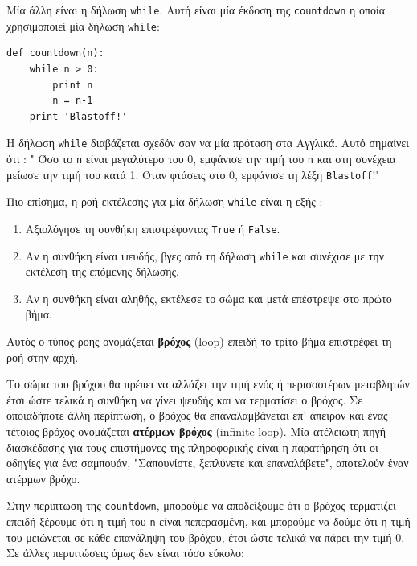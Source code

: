\documentclass[10pt]{book}
\begin{document}
Μία άλλη είναι η δήλωση {\tt while}. Αυτή είναι μία έκδοση
της {\tt countdown} η οποία χρησιμοποιεί μία δήλωση {\tt while}:

\begin{verbatim}
def countdown(n):
    while n > 0:
        print n
        n = n-1
    print 'Blastoff!'
\end{verbatim}
%

Η δήλωση {\tt while} διαβάζεται σχεδόν σαν να μία πρόταση στα Αγγλικά.
Αυτό σημαίνει ότι : " Όσο το {\tt n} είναι μεγαλύτερο του 0,
εμφάνισε την τιμή του {\tt n} και στη συνέχεια μείωσε την τιμή του κατά 1.
Όταν φτάσεις στο 0, εμφάνισε τη λέξη {\tt Blastoff}!"

Πιο επίσημα, η ροή εκτέλεσης για μία δήλωση {\tt while} είναι η εξής :

\begin{enumerate}

\item Αξιολόγησε τη συνθήκη επιστρέφοντας {\tt True} ή {\tt False}.

\item Αν η συνθήκη είναι ψευδής, βγες από τη δήλωση  {\tt while}  και συνέχισε με την εκτέλεση της επόμενης δήλωσης.

\item Αν η συνθήκη είναι αληθής, εκτέλεσε το σώμα και μετά επέστρεψε στο πρώτο βήμα.

\end{enumerate}

Αυτός ο τύπος ροής ονομάζεται {\bf βρόχος} (loop) επειδή το
τρίτο βήμα επιστρέφει τη ροή στην αρχή.

Το σώμα του βρόχου θα πρέπει να αλλάζει την τιμή ενός ή περισσοτέρων
μεταβλητών έτσι ώστε τελικά η συνθήκη να γίνει ψευδής και να τερματίσει
ο βρόχος. Σε οποιαδήποτε άλλη περίπτωση, ο βρόχος θα επαναλαμβάνεται επ' άπειρον και ένας τέτοιος βρόχος ονομάζεται {\bf ατέρμων βρόχος} (infinite loop). Μία ατέλειωτη πηγή διασκέδασης για τους επιστήμονες της
πληροφορικής είναι η παρατήρηση ότι οι οδηγίες για ένα σαμπουάν, 
"Σαπουνίστε, ξεπλύνετε και επαναλάβετε", αποτελούν έναν ατέρμων βρόχο.

Στην περίπτωση της {\tt countdown}, μπορούμε να αποδείξουμε ότι ο
βρόχος τερματίζει επειδή ξέρουμε ότι η τιμή του {\tt n} είναι πεπερασμένη,
και μπορούμε να δούμε ότι η τιμή του μειώνεται σε κάθε επανάληψη του βρόχου, έτσι ώστε τελικά να πάρει την τιμή 0. Σε άλλες περιπτώσεις όμως δεν είναι τόσο εύκολο:
\end{document}
